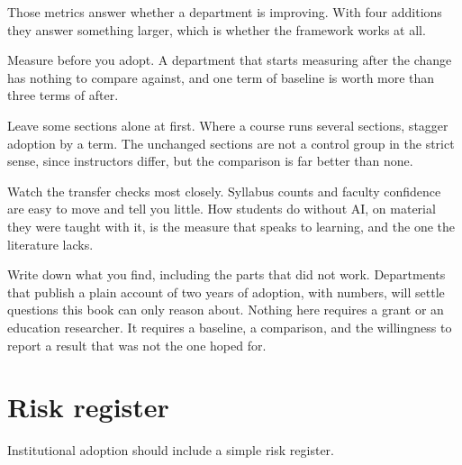 \documentclass{SIAMbook2023}
\begin{document}
Those metrics answer whether a department is improving. With four additions they answer something
larger, which is whether the framework works at all.

Measure before you adopt. A department that starts measuring after the change has nothing to compare
against, and one term of baseline is worth more than three terms of after.

Leave some sections alone at first. Where a course runs several sections, stagger adoption by a term.
The unchanged sections are not a control group in the strict sense, since instructors differ, but the
comparison is far better than none.

Watch the transfer checks most closely. Syllabus counts and faculty confidence are easy to move and
tell you little. How students do without AI, on material they were taught with it, is the measure
that speaks to learning, and the one the literature lacks.

Write down what you find, including the parts that did not work. Departments that publish a plain
account of two years of adoption, with numbers, will settle questions this book can only reason
about. Nothing here requires a grant or an education researcher. It requires a baseline, a
comparison, and the willingness to report a result that was not the one hoped for.

\section{Risk register}
\label{u:sec:risk-register}%

Institutional adoption should include a simple risk register.
\end{document}
